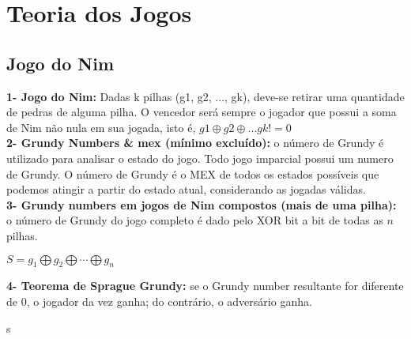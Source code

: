 \section{Teoria dos Jogos}

\subsection{Jogo do Nim}
    \textbf{1- Jogo do Nim:} Dadas k pilhas (g1, g2, ..., gk), deve-se retirar uma quantidade de pedras de alguma pilha. O vencedor será sempre o jogador que possui a soma de Nim não nula em sua jogada, isto é, $g1 \oplus g2 \oplus ... gk != 0$
    \\
    
    \textbf{2- Grundy Numbers \& mex (mínimo excluído):} o número de Grundy é utilizado para analisar o estado do jogo. Todo jogo imparcial possui um numero de Grundy. O número de Grundy é o MEX de todos os estados possíveis que podemos atingir a partir do estado atual, considerando as jogadas válidas.
    \\
    
    \textbf{3- Grundy numbers em jogos de Nim compostos (mais de uma pilha):} o número de Grundy do jogo completo é dado pelo XOR bit a bit de todas as $n$ pilhas.
    \begin{center}
        $S = g_1 \bigoplus g_2 \bigoplus \cdots \bigoplus g_n$
    \end{center}
    
    \textbf{4- Teorema de Sprague Grundy:} se o Grundy number resultante for diferente de 0, o jogador da vez ganha; do contrário, o adversário ganha.
\pagebreak

s